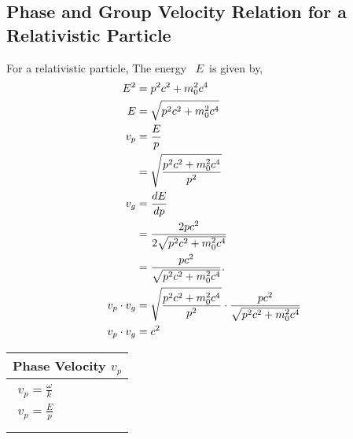 \subsection{ Phase and Group Velocity Relation  for a Relativistic Particle}
For a relativistic particle, The energy \ $E$\ is given by,
\begin{align}
E^{2} &=p^{2} c^{2}+m_{0}^{2} c^{4} \\
E &=\sqrt{p^{2} c^{2}+m_{0}^{2} c^{4}}\notag \\
v_{p} &=\frac{E}{p} \\
&=\sqrt{\frac{p^{2} c^{2}+m_{0}^{2} c^{4}}{p^{2}}}\notag \\
v_{g} &=\frac{d E}{d p} \\
&=\frac{{2 p c^{2}}}{2 \sqrt{p^{2} c^{2}+m_{0}^{2} c^{4}}}\notag \\
&=\frac{p c^{2}}{\sqrt{p^{2} c^{2}+m_{0}^{2} c^{4}}} . \\
v_{p} \cdot v_{g}&=\sqrt{\frac{p^{2} c^{2}+m_{0}^{2} c^{4}}{p^{2}}}\cdot \frac{p c^{2}}{\sqrt{p^{2} c^{2}+m_{0}^{2} c^{4}}}\\
v_{p} \cdot v_{g}&=c^{2}
\end{align}
\begin{center}
\end{center}
\begin{minipage}{0.25\textwidth}
	\begin{table}[H]
		\centering
		\renewcommand{\arraystretch}{2.5}
		\begin{tabularx}{1\textwidth} { 
				| >{\centering\arraybackslash}X 
				|   }
			\hline
			\rowcolor{ocrel} \large \textbf{Phase Velocity $v_{p}$} \\
			\hline
			\hline
			$\begin{array}{l}
			v_{p} =\frac{\omega}{k} \\
			v_{p} =\frac{E}{p}\\
			\end{array}$\\ \hline
			
			
		\end{tabularx}
		
	\end{table}
\end{minipage}
